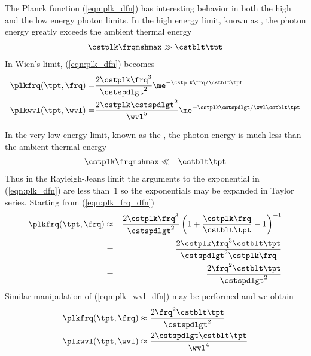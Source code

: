 \documentclass[12pt]{article}
\begin{document}
The Planck function (\ref{eqn:plk_dfn}) has interesting behavior in
both the high and the low energy photon limits. 
In the high energy limit, known as ,
the photon energy greatly exceeds the ambient thermal energy
\begin{eqnarray}
\cstplk \frqmshmax \gg \cstblt \tpt
\label{eqn:wien_dfn}
\end{eqnarray}
In Wien's limit, (\ref{eqn:plk_dfn}) becomes
\begin{subequations}
\label{eqn:plk_wien_dfn}
\begin{align}
\label{eqn:plk_frq_wien_dfn}
\plkfrq(\tpt,\frq) = & \frac{2 \cstplk \frq^{3}}{\cstspdlgt^{2}}
\me^{-\cstplk \frq / \cstblt \tpt} \\
\label{eqn:plk_wvl_wien_dfn}
\plkwvl(\tpt,\wvl) = & \frac{2 \cstplk \cstspdlgt^{2}}{\wvl^{5}} 
\me^{-\cstplk \cstspdlgt / \wvl \cstblt \tpt}
\end{align}
\end{subequations}

In the very low energy limit, known as the , the photon energy is much less than the ambient thermal energy 
\begin{eqnarray}
\cstplk \frqmshmax & \ll & \cstblt \tpt
\label{eqn:ryl_jean_dfn}
\end{eqnarray}
Thus in the Rayleigh-Jeans limit the arguments to the exponential in
(\ref{eqn:plk_dfn}) are less than~$1$ so the exponentials may be
expanded in Taylor series.
Starting from (\ref{eqn:plk_frq_dfn}) 
\begin{eqnarray}
\plkfrq(\tpt,\frq) & \approx & 
\frac{2 \cstplk \frq^{3}}{\cstspdlgt^{2}}
\left(1 + \frac{\cstplk \frq}{\cstblt \tpt} -1 \right)^{-1}
\nonumber \\
& = & 
\frac{2 \cstplk \frq^{3} \cstblt \tpt}{\cstspdlgt^{2} \cstplk \frq}
\nonumber \\
& = & 
\frac{2 \frq^{2} \cstblt \tpt}{\cstspdlgt^{2}}
\end{eqnarray}
Similar manipulation of (\ref{eqn:plk_wvl_dfn}) may be performed 
and we obtain
\begin{subequations}
\label{eqn:plk_ryl_jean_dfn}
\begin{align}
\label{eqn:plk_frq_ryl_jean_dfn}
\plkfrq(\tpt,\frq) & \approx  
\frac{2 \frq^{2} \cstblt \tpt}{\cstspdlgt^{2} } \\
\label{eqn:plk_wvl_ryl_jean_dfn}
\plkwvl(\tpt,\wvl) & \approx  
\frac{2 \cstspdlgt \cstblt \tpt}{\wvl^{4}}
\end{align}
\end{subequations}
\end{document}
